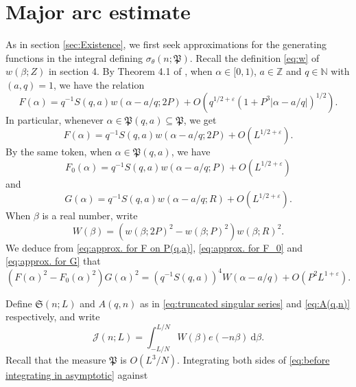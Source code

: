 \documentclass[12pt,english,reqno]{amsart}
\theoremstyle{definition}
\theoremstyle{remark}
\numberwithin{equation}{section}
\numberwithin{equation}{section}
\numberwithin{figure}{section}
\theoremstyle{plain}
\theoremstyle{plain}
\theoremstyle{plain}
\theoremstyle{plain}
\numberwithin{equation}{section}
\numberwithin{thm}{section}
\begin{document}
\section{Major arc estimate}
As in section \ref{sec:Existence}, we first seek approximations for
the generating functions in the integral defining $\sigma_{\theta}(n;\mathfrak{P})$.
Recall the definition \eqref{eq:w} of $w(\beta;Z)$ in section 4. By Theorem 4.1 of \cite{vaughan1997}, when $\alpha\in[0,1)$, $a\in\mathbb{Z}$
and $q\in\mathbb{N}$ with $(a,q)=1$, we have the relation
\begin{equation}
F(\alpha)=q^{-1}S(q,a)w(\alpha-a/q;2P)+O(q^{1/2+\varepsilon}(1+P^{3}|\alpha-a/q|)^{1/2}).\label{eq:approximating F}\end{equation}
In particular, whenever $\alpha\in\mathfrak{P}(q,a)\subseteq\mathfrak{P}$, we get
\begin{equation}
F(\alpha)=q^{-1}S(q,a)w(\alpha-a/q;2P)+O(L^{1/2+\varepsilon}).\label{eq:approx. for F on P(q,a)}\end{equation}
By the same token, when $\alpha\in\mathfrak{P}(q,a)$, we have
\begin{equation}
F_{0}(\alpha)=q^{-1}S(q,a)w(\alpha-a/q;P)+O(L^{1/2+\varepsilon})\label{eq:approx. for F_0}\end{equation}
and \begin{equation}
G(\alpha)=q^{-1}S(q,a)w(\alpha-a/q;R)+O(L^{1/2+\varepsilon}).\label{eq:approx. for G}\end{equation}
When $\beta$ is a real number, write
\begin{equation}
W(\beta)=(w(\beta;2P)^{2}-w(\beta;P)^{2})w(\beta;R)^{2}.\label{eq:W}\end{equation}
We deduce from \eqref{eq:approx. for F on P(q,a)}, \eqref{eq:approx. for F_0}
and \eqref{eq:approx. for G} that
\begin{equation}
(F(\alpha)^{2}-F_{0}(\alpha)^{2})G(\alpha)^{2}=(q^{-1}S(q,a))^{4}W(\alpha-a/q)+O(P^{2}L^{1+\varepsilon}).\label{eq:before integrating in asymptotic}\end{equation}
\par Define $\mathfrak{S}(n;L)$ and $A(q,n)$ as in \eqref{eq:truncated singular series}
and \eqref{eq:A(q,n)} respectively, and write
\begin{equation}
\mathcal{J}(n;L)=\int_{-L/N}^{L/N}W(\beta)e(-n\beta)\:\mathrm{d}\beta.\label{eq:truncated singular integral for asymptotic}\end{equation}
Recall that the measure $\mathfrak{P}$ is $O(L^{3}/N)$. Integrating
both sides of \eqref{eq:before integrating in asymptotic} against
\end{document}

